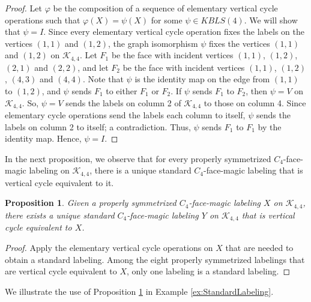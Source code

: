 \documentclass[10pt, reqno]{amsart}
\theoremstyle{definition}
\theoremstyle{plain}
\newtheorem{proposition}[definition]{Proposition}
\begin{document}
\begin{proof}
    Let $\varphi$ be the composition of a sequence of elementary vertical cycle operations such that 
    $\varphi(X)=\psi(X)$ for some $\psi\in\mathit{KBLS}(4)$.
    We will show that $\psi=I$.
    Since every elementary vertical cycle operation fixes the labels 
    on the vertices $(1,1)$ and $(1,2)$, the graph isomorphism
    $\psi$ fixes the vertices $(1,1)$ and $(1,2)$ on $\mathcal{K}_{4,4}$.
    Let $F_1$ be the face with incident 
    vertices $(1,1)$, $(1,2)$, $(2,1)$ and $(2,2)$, and let $F_2$ be the face
    with incident vertices $(1,1)$, $(1,2)$, $(4,3)$ and $(4,4)$.
    Note that  $\psi$ is the identity map on the edge from $(1,1)$ to $(1,2)$,
    and $\psi$ sends $F_1$ to either $F_1$ or $F_2$.
    If $\psi$ sends $F_1$ to $F_2$, then $\psi=V$ on $\mathcal{K}_{4,4}$.
    So, $\psi=V$ sends the labels on column 2 of $\mathcal{K}_{4,4}$ to those on column 4.
    Since elementary cycle operations send the labels each column to itself,
    $\psi$ sends the labels on column 2 to itself; a contradiction.
    Thus, $\psi$ sends $F_1$ to $F_1$ by the identity map. Hence, $\psi=I$.
\end{proof}



  



In the next proposition, we observe that for every 
properly symmetrized $C_4$-face-magic labeling on
$\mathcal{K}_{4,4}$, there is a unique standard 
$C_4$-face-magic labeling that is vertical cycle 
equivalent to it.

\begin{proposition} \label{prop:StandardLabel}
    Given a properly symmetrized $C_4$-face-magic labeling $X$ on
    $\mathcal{K}_{4,4}$, there exists a unique
    standard
    $C_4$-face-magic labeling $Y$ on
    $\mathcal{K}_{4,4}$ that is 
    vertical cycle equivalent to $X$.
\end{proposition}

\begin{proof}
 Apply the elementary vertical cycle operations on $X$
 that are needed to obtain a standard labeling.
 Among the eight properly symmetrized labelings that
 are vertical cycle equivalent to $X$,
 only one labeling is a standard labeling.
\end{proof}

We illustrate the use of Proposition 
\ref{prop:StandardLabel} in Example \ref{ex:StandardLabeling}.
\end{document}
